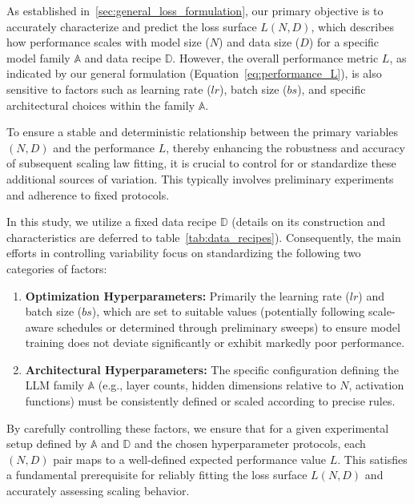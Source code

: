 \documentclass{article}
\begin{document}
As established in~\ref{sec:general_loss_formulation}, our primary objective is to accurately characterize and predict the loss surface $L(N, D)$, which describes how performance scales with model size ($N$) and data size ($D$) for a specific model family $\mathbb{A}$ and data recipe $\mathbb{D}$. However, the overall performance metric $L$, as indicated by our general formulation (Equation~\eqref{eq:performance_L}), is also sensitive to factors such as learning rate ($lr$), batch size ($bs$), and specific architectural choices within the family $\mathbb{A}$.

To ensure a stable and deterministic relationship between the primary variables $(N, D)$ and the performance $L$, thereby enhancing the robustness and accuracy of subsequent scaling law fitting, it is crucial to control for or standardize these additional sources of variation. This typically involves preliminary experiments and adherence to fixed protocols.

In this study, we utilize a fixed data recipe $\mathbb{D}$ (details on its construction and characteristics are deferred to table~\ref{tab:data_recipes}). Consequently, the main efforts in controlling variability focus on standardizing the following two categories of factors:
\begin{enumerate}
    \item \textbf{Optimization Hyperparameters:} Primarily the learning rate ($lr$) and batch size ($bs$), which are set to suitable values (potentially following scale-aware schedules or determined through preliminary sweeps) to ensure model training does not deviate significantly or exhibit markedly poor performance.
    \item \textbf{Architectural Hyperparameters:} The specific configuration defining the LLM family $\mathbb{A}$ (e.g., layer counts, hidden dimensions relative to $N$, activation functions) must be consistently defined or scaled according to precise rules.
\end{enumerate}
By carefully controlling these factors, we ensure that for a given experimental setup defined by $\mathbb{A}$ and $\mathbb{D}$ and the chosen hyperparameter protocols, each $(N, D)$ pair maps to a well-defined expected performance value $L$. This satisfies a fundamental prerequisite for reliably fitting the loss surface $L(N, D)$ and accurately assessing scaling behavior.
\end{document}
